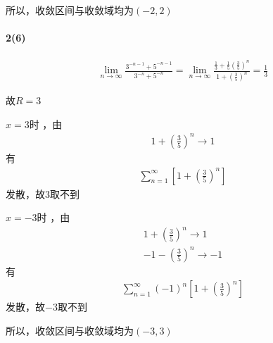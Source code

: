 \documentclass[UTF8]{ctexart}
\begin{document}
    所以，收敛区间与收敛域均为$(-2,2)$

    \paragraph*{2(6)}
    \begin{align*}
        \lim \limits_{n \to \infty} \frac{3^{-n-1} + 5^{-n-1}}{3^{-n}+5^{-n}} 
        = \lim \limits_{n \to \infty} 
        \frac{\frac{1}{3}  + \frac{1}{5} \left(\frac{3}{5}\right)^{n} }{1+\left(\frac{3}{5}\right)^{n}}
        = \frac{1}{3} 
    \end{align*}

    故$R=3$

    $x = 3$时 ，由
    \begin{align*}
        1 + \left(\frac{3}{5} \right)^n \to 1
    \end{align*}
    有
    \begin{align*}
        \sum_{n=1}^{\infty} \left[1 + \left(\frac{3}{5} \right)^n\right]
    \end{align*}
    发散，故$3$取不到

    $x = -3$时 ，由
    \begin{align*}
        1 + \left(\frac{3}{5} \right)^n \to 1 \\
        -1 - \left(\frac{3}{5} \right)^n \to -1
    \end{align*}
    有
    \begin{align*}
        \sum_{n=1}^{\infty} (-1)^n \left[1 + \left(\frac{3}{5} \right)^n\right]
    \end{align*}
    发散，故$-3$取不到

    所以，收敛区间与收敛域均为$(-3,3)$
\end{document}

